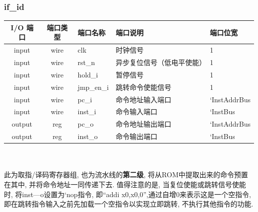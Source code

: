 \documentclass[lang=cn,11pt,a4paper,chinesefont=founder]{elegantpaper}
\begin{document}
\subsubsection{if\_id}
\begin{tabular}{cclll}
    \toprule
    I/O 端口 & 端口类型 & 端口名称   & 端口说明                   & 端口位宽     \\
    \midrule
    input    & wire     & clk        & 时钟信号                   & 1            \\
    input    & wire     & rst\_n     & 异步复位信号（低电平使能） & 1            \\
    input    & wire     & hold\_i    & 暂停信号                   & 1            \\
    input    & wire     & jmp\_en\_i & 跳转命令使能信号           & 1            \\
    input    & wire     & pc\_i      & 命令地址输入端口           & `InstAddrBus \\
    input    & wire     & inst\_i    & 命令输入端口               & `InstBus     \\
    output   & reg      & pc\_o      & 命令地址输出端口           & `InstAddrBus \\
    output   & reg      & inst\_o    & 命令输出端口               & `InstBus     \\
    \bottomrule
\end{tabular}\\
\\
此为取指/译码寄存器组, 也为流水线的\textbf{第二级}, 将从ROM中提取出来的命令预置在其中, 并将命令地址一同传递下去. 值得注意的是, 当复位使能或跳转信号使能时, 将inst—o设置为`nop指令, 即“addi x0,x0,0”,通过自增0来表示这是一个空指令, 即在跳转指令输入之前先加载一个空指令以实现立即跳转, 不执行其他指令的功能. 
\end{document}
